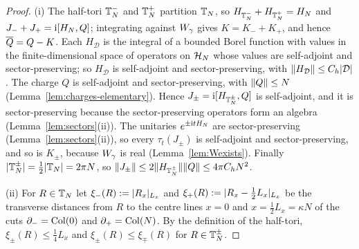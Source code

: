 \begin{proof}
(i) The half-tori $\mathbb{T}_N^-$ and $\mathbb{T}_N^+$ partition $\mathbb{T}_N$, so $H_{\mathbb{T}_N^-}+H_{\mathbb{T}_N^+}=H_N$ and
$J_-+J_+=\mathrm{i}[H_N,Q]$; integrating against $W_{\gamma}$ gives $K=K_-+K_+$, and hence $\overline{Q}=Q-K$. Each $H_{\mathcal D}$ is the
integral of a bounded Borel function with values in the finite-dimensional space of operators on $\mathcal{H}_N$ whose
values are self-adjoint and sector-preserving; so $H_{\mathcal D}$ is self-adjoint and sector-preserving, with
$\lVert H_{\mathcal D}\rVert\le C_h\lvert\mathcal D\rvert$. The charge $Q$ is self-adjoint and sector-preserving, with
$\lVert Q\rVert\le N$ (Lemma~\ref{lem:charges-elementary}). Hence $J_\pm=\mathrm{i}[H_{\mathbb{T}_N^\pm},Q]$ is self-adjoint, and it is
sector-preserving because the sector-preserving operators form an algebra (Lemma~\ref{lem:sectors}(ii)). The unitaries
$e^{\pm\mathrm{i} tH_N}$ are sector-preserving (Lemma~\ref{lem:sectors}(ii)), so every $\tau_t(J_\pm)$ is self-adjoint and
sector-preserving, and so is $K_\pm$, because $W_{\gamma}$ is real (Lemma~\ref{lem:Wexists}). Finally
$\lvert\mathbb{T}_N^\pm\rvert=\frac12\lvert\mathbb{T}_N\rvert=2\pi N$, so $\lVert J_\pm\rVert\le2\lVert H_{\mathbb{T}_N^\pm}\rVert\lVert Q\rVert\le4\pi C_hN^2$.

(ii) For $R\in\mathbb{T}_N$ let $\xi_-(R):=\lvert R_x\rvert_{L_x}$ and $\xi_+(R):=\lvert R_x-\frac12L_x\rvert_{L_x}$ be the transverse distances
from $R$ to the centre lines $x=0$ and $x=\frac12L_x=\kappa N$ of the cuts $\partial_{-}=\mathrm{Col}(0)$ and $\partial_{+}=\mathrm{Col}(N)$. By the
definition of the half-tori, $\xi_\pm(R)\le\frac14L_x$ and $\xi_\pm(R)\le\xi_\mp(R)$ for $R\in\mathbb{T}_N^\pm$.


\end{proof}
